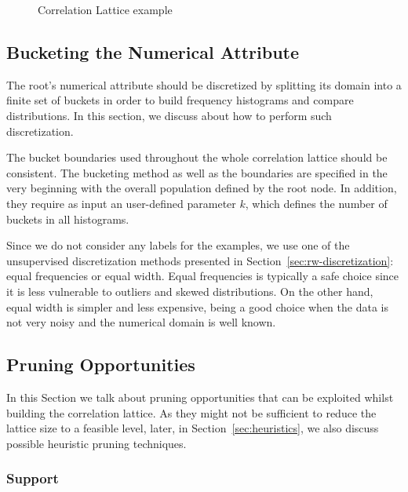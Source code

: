 \begin{figure}[!h]
  \caption{Correlation Lattice example}
  \centering
  \begin{tikzpicture}
  [scale=1.8,auto=center,every node/.style={draw=black, font=\tiny}]
  
  \end{tikzpicture}
  \label{fig:lattice}
\end{figure}

\subsection{Bucketing the Numerical Attribute}

The root's numerical attribute should be discretized by splitting its domain into a finite set of buckets in
order to build frequency histograms and compare distributions. In this section, we discuss about how to perform
such discretization.

The bucket boundaries used throughout the whole correlation lattice should be consistent. The bucketing method
as well as the boundaries are specified in the very beginning with the overall population defined by the root node. In
addition, they require as input an user-defined parameter $k$, which defines the number of buckets in all histograms.

Since we do not consider any labels for the examples, we use one of the unsupervised discretization methods presented
in Section~\ref{sec:rw-discretization}: equal frequencies or equal width. Equal frequencies is typically a safe choice
since it is less vulnerable to outliers and skewed distributions. On the other hand, equal width is simpler and less
expensive, being a good choice when the data is not very noisy and the numerical domain is well known.

\subsection{Pruning Opportunities}

In this Section we talk about pruning opportunities that can be exploited whilst building the correlation
lattice. As they might not be sufficient to reduce the lattice size to a feasible
level, later, in Section~\ref{sec:heuristics}, we also discuss possible heuristic pruning techniques.

\subsubsection{Support}

